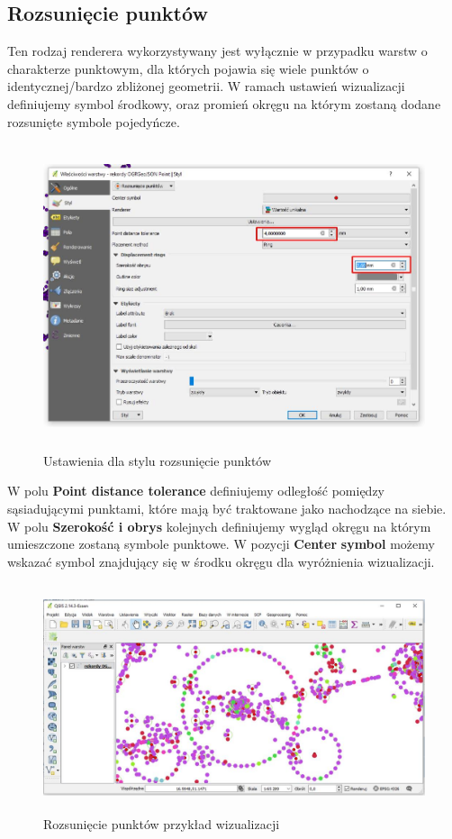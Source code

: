 \documentclass[12pt,a4paper]{book}
\begin{document}
\subsection{Rozsunięcie punktów}
Ten rodzaj renderera wykorzystywany jest wyłącznie w przypadku warstw o charakterze punktowym, dla których pojawia się wiele punktów o identycznej/bardzo zbliżonej geometrii. W ramach ustawień wizualizacji definiujemy symbol środkowy, oraz promień okręgu na którym zostaną dodane rozsunięte symbole pojedyńcze.



\begin{center}
\begin{figure}
\includegraphics[width=13cm,height=8.946cm]{007-rozsuniecie.jpg}
\caption{Ustawienia dla stylu rozsunięcie punktów}
\end{figure}
\end{center}
W polu \textbf{Point distance tolerance} definiujemy odległość pomiędzy sąsiadującymi punktami, które mają być traktowane jako nachodzące na siebie. W polu \textbf{Szerokość i obrys} kolejnych definiujemy wygląd okręgu na którym umieszczone zostaną symbole punktowe. W pozycji \textbf{Center} \textbf{symbol} możemy wskazać symbol znajdujący się w środku okręgu dla wyróżnienia wizualizacji.



\begin{center}
\begin{figure}
\includegraphics[width=13cm,height=6.689cm]{007-rozs-wiz.jpg}
\caption{Rozsunięcie punktów przykład wizualizacji}
\end{figure}
\end{center}
\end{document}
